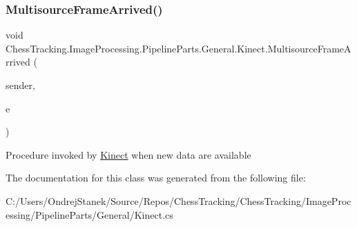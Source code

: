 \subsubsection{\texorpdfstring{MultisourceFrameArrived()}{MultisourceFrameArrived()}}
{\footnotesize\ttfamily void Chess\+Tracking.\+Image\+Processing.\+Pipeline\+Parts.\+General.\+Kinect.\+Multisource\+Frame\+Arrived (\begin{DoxyParamCaption}\item[{object}]{sender,  }\item[{Multi\+Source\+Frame\+Arrived\+Event\+Args}]{e }\end{DoxyParamCaption})\hspace{0.3cm}{\ttfamily [private]}}



Procedure invoked by \mbox{\hyperlink{class_chess_tracking_1_1_image_processing_1_1_pipeline_parts_1_1_general_1_1_kinect}{Kinect}} when new data are available 



The documentation for this class was generated from the following file\+:\begin{DoxyCompactItemize}
\item 
C\+:/\+Users/\+Ondrej\+Stanek/\+Source/\+Repos/\+Chess\+Tracking/\+Chess\+Tracking/\+Image\+Processing/\+Pipeline\+Parts/\+General/Kinect.\+cs\end{DoxyCompactItemize}
